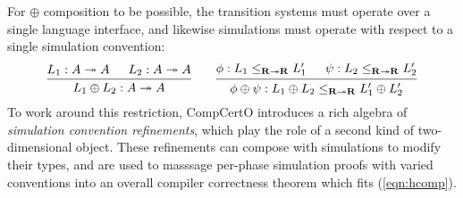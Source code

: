 \documentclass[acmsmall,screen,review,anonymous]{acmart}
\begin{document}
For $\oplus$ composition to be possible,
the transition systems must operate
over a single language interface,
and likewise simulations must operate
with respect to a single simulation convention:
\begin{equation} \label{eqn:hcomp}
  \begin{prooftree}
    \hypo{L_1 : A \twoheadrightarrow A}
    \hypo{L_2 : A \twoheadrightarrow A}
    \infer2{L_1 \oplus L_2 : A \twoheadrightarrow A}
  \end{prooftree}
  \qquad
  \begin{prooftree}
    \hypo{\phi: L_1 \le_{\mathbf{R} \twoheadrightarrow \mathbf{R}} L_1'}
    \hypo{\psi: L_2 \le_{\mathbf{R} \twoheadrightarrow \mathbf{R}} L_2'}
    \infer2{\phi \oplus \psi :
      L_1 \oplus L_2 \le_{\mathbf{R} \twoheadrightarrow \mathbf{R}} L_1' \oplus L_2'}
  \end{prooftree}
\end{equation}
To work around this restriction,
CompCertO introduces a rich algebra of \emph{simulation convention refinements},
which play the role of a second kind of two-dimensional object.
These refinements can compose
with simulations to modify their types,
and are used to masssage per-phase
simulation proofs with varied conventions into
an overall compiler correctness theorem
which fits (\ref{eqn:hcomp}).

\end{document}
